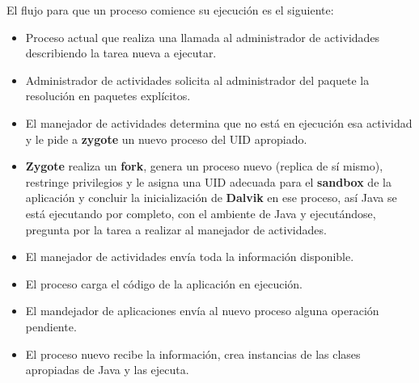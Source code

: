 \documentclass[a4paper]{article}
\begin{document}
{El flujo para que un proceso comience su ejecución es el siguiente: \\
\begin{itemize}
  \item Proceso actual que realiza una llamada al administrador de actividades describiendo la tarea nueva a ejecutar.
  \item Administrador de actividades solicita al administrador del paquete la resolución en paquetes explícitos.
  \item El manejador de actividades determina que no está en ejecución esa actividad y le pide a \textbf{zygote} un nuevo proceso del UID apropiado.
  \item \textbf{Zygote} realiza un \textbf{fork}, genera un proceso nuevo (replica de sí mismo), restringe privilegios y le asigna una UID adecuada para el \textbf{sandbox} de la aplicación y concluir la inicialización de \textbf{Dalvik} en ese proceso, así Java se está ejecutando por completo, con el ambiente de Java y ejecutándose, pregunta por la tarea a realizar al manejador de actividades.
  \item El manejador de actividades envía toda la información disponible.
  \item El proceso carga el código de la aplicación en ejecución.\\
  \item El mandejador de aplicaciones envía al nuevo proceso alguna operación pendiente.
  \item El proceso nuevo recibe la información, crea instancias de las clases apropiadas de Java y las ejecuta.\\
\end{itemize}}




\begin{center}

\end{center}
  
\end{document}
